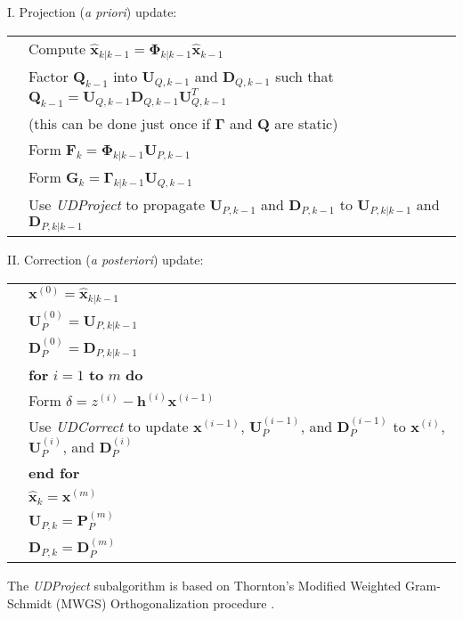 I. Projection (\textit{a priori}) update:

\begin{tabular}{l l}
\phantom{.} & Compute $\hat{\mathbf{x}}_{k|k-1} = \mathbf{\Phi}_{k|k-1} \hat{\mathbf{x}}_{k-1}$ \\
\phantom{.} & Factor $\mathbf{Q}_{k-1}$ into $\mathbf{U}_{Q,k-1}$ and $\mathbf{D}_{Q,k-1}$ such that
    $\mathbf{Q}_{k-1} = \mathbf{U}_{Q,k-1} \mathbf{D}_{Q,k-1} \mathbf{U}_{Q,k-1}^T$\\
\phantom{.} & \phantom{MM} (this can be done just once if $\mathbf{\Gamma}$ and $\mathbf{Q}$ are static) \\
\phantom{.} & Form $\mathbf{F}_k = \mathbf{\Phi}_{k|k-1} \mathbf{U}_{P,k-1}$\\
\phantom{.} & Form $\mathbf{G}_k = \mathbf{\Gamma}_{k|k-1} \mathbf{U}_{Q,k-1}$\\
\phantom{.} & Use \textit{UDProject} to propagate $\mathbf{U}_{P,k-1}$ and $\mathbf{D}_{P,k-1}$
    to $\mathbf{U}_{P,k|k-1}$ and $\mathbf{D}_{P,k|k-1}$
\end{tabular}

II. Correction (\textit{a posteriori}) update:

\begin{tabular}{l l}
\phantom{.} & $\mathbf{x}^{(0)} = \hat{\mathbf{x}}_{k|k-1}$ \\
\phantom{.} & $\mathbf{U}_P^{(0)} = \mathbf{U}_{P,k|k-1}$ \\
\phantom{.} & $\mathbf{D}_P^{(0)} = \mathbf{D}_{P,k|k-1}$ \\
\phantom{.} & \textbf{for} $i = 1$ \textbf{to} $m$ \textbf{do} \\
\phantom{.} & \phantom{MM} Form ${\delta} = {z}^{(i)} - \mathbf{h}^{(i)} \mathbf{x}^{(i-1)}$ \\
\phantom{.} & \phantom{MM} Use \textit{UDCorrect} to update $\mathbf{x}^{(i-1)}$, $\mathbf{U}_P^{(i-1)}$,
    and $\mathbf{D}_P^{(i-1)}$ to $\mathbf{x}^{(i)}$, $\mathbf{U}_P^{(i)}$, and $\mathbf{D}_P^{(i)}$ \\
\phantom{.} & \textbf{end for} \\
\phantom{.} & $\hat{\mathbf{x}}_{k} = \mathbf{x}^{(m)}$ \\
\phantom{.} & $\mathbf{U}_{P,k} = \mathbf{P}_P^{(m)}$ \\
\phantom{.} & $\mathbf{D}_{P,k} = \mathbf{D}_P^{(m)}$
\end{tabular}

The \textit{UDProject} subalgorithm is based on Thornton’s Modified Weighted Gram-Schmidt (MWGS)
Orthogonalization procedure \cite{thornton1976}.

